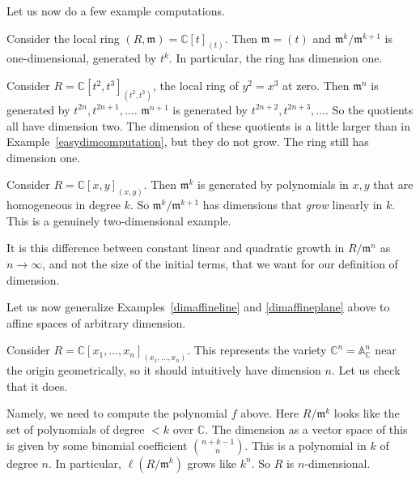 Let us now do a few example computations. 

\begin{example} \label{easydimcomputation}
\label{dimaffineline}
Consider the local ring $(R, \mathfrak{m}) = \mathbb{C}[t]_{(t)}$. Then $\mathfrak{m} = (t)$ and
$\mathfrak{m}^k/\mathfrak{m}^{k+1}$ is one-dimensional, generated by $t^k$. In
particular, the ring has dimension one. 
\end{example} 

\begin{example} Consider $R = \mathbb{C}[t^2, t^3]_{(t^2, t^3)}$, the local ring of $y^2 = x^3$
at zero. Then $\mathfrak{m}^n$ is generated by $t^{2n}, t^{2n+1}, \dots$.
$\mathfrak{m}^{n+1}$ is generated by $t^{2n+2}, t^{2n+3}, \dots$. So the
quotients all have dimension two. The dimension of these quotients is a little
larger than in Example~\ref{easydimcomputation}, but they do not grow. The ring still has dimension one. 
\end{example} 

\begin{example} \label{dimaffineplane}
Consider $R = \mathbb{C}[x,y]_{(x,y)}$. Then $\mathfrak{m}^k$ is generated by
polynomials in $x,y$ that are homogeneous in degree $k$. So $\mathfrak{m}^k/\mathfrak{m}^{k+1}$
has dimensions that \emph{grow} linearly in $k$. This is a genuinely two-dimensional
example. 
\end{example} 

It is this difference between constant linear and quadratic growth in
$R/\mathfrak{m}^n$ as $n \to \infty$, and not the size of the initial terms,
that we want for our definition of dimension.

Let us now generalize Examples~\ref{dimaffineline} and \ref{dimaffineplane}
above to affine spaces of arbitrary dimension. 
\begin{example} 
Consider $R = \mathbb{C}[x_1, \dots, x_n]_{(x_1, \dots, x_n)}$. 
This represents the variety $\mathbb{C}^n = \mathbb{A}^n_{\mathbb{C}}$ near the origin geometrically, so
it should intuitively have dimension $n$. Let us check that it does. 

Namely, we need to compute the polynomial $f$ above. Here $R/\mathfrak{m}^k$ looks like the set of
polynomials of degree $<k$ over $\mathbb{C}$. The dimension as a vector space
of this is
given by some binomial coefficient $\binom{n+k-1}{n}$. This is a polynomial in
$k$ of degree $n$. In particular, $\ell(R/\mathfrak{m}^k)$ grows like $k^n$.
So $R$ is $n$-dimensional. 
\end{example} 


